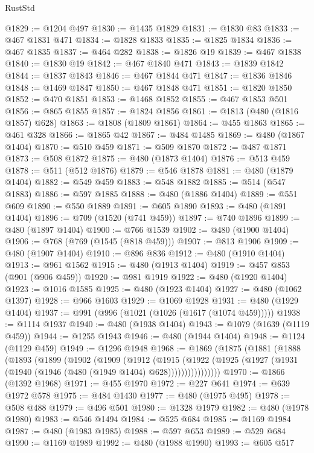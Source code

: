 \begin{lexlean}{RustStd}
\begin{coremodule}
{\begin{coremodule}
{{{{{{{{{{{{{{{{{{{{{{{{{{{{{{{{{@1829 := @1204 @497
@1830 := @1435 @1829
@1831 := @1830 @83
@1833 := @467 @1831 @471
@1834 := @1828 @1833
@1835 := @1825 @1834
@1836 := @467 @1835
@1837 := @464 @282
@1838 := @1826 @19
@1839 := @467 @1838
@1840 := @1830 @19
@1842 := @467 @1840 @471
@1843 := @1839 @1842
@1844 := @1837 @1843
@1846 := @467 @1844 @471
@1847 := @1836 @1846
@1848 := @1469 @1847
@1850 := @467 @1848 @471
@1851 := @1820 @1850
@1852 := @470 @1851
@1853 := @1468 @1852
@1855 := @467 @1853 @501
@1856 := @865 @1855
@1857 := @1824 @1856
@1861 := @1813 (@480 (@1816 @1857) @628)
@1863 := @1808 (@1809 @1861)
@1864 := @455 @1863
@1865 := @461 @328
@1866 := @1865 @42
@1867 := @484 @1485
@1869 := @480 (@1867 @1404)
@1870 := @510 @459
@1871 := @509 @1870
@1872 := @487 @1871
@1873 := @508 @1872
@1875 := @480 (@1873 @1404)
@1876 := @513 @459
@1878 := @511 (@512 @1876)
@1879 := @546 @1878
@1881 := @480 (@1879 @1404)
@1882 := @549 @459
@1883 := @548 @1882
@1885 := @514 (@547 @1883)
@1886 := @597 @1885
@1888 := @480 (@1886 @1404)
@1889 := @551 @609
@1890 := @550 @1889
@1891 := @605 @1890
@1893 := @480 (@1891 @1404)
@1896 := @709 (@1520 (@741 @459))
@1897 := @740 @1896
@1899 := @480 (@1897 @1404)
@1900 := @766 @1539
@1902 := @480 (@1900 @1404)
@1906 := @768 (@769 (@1545 (@818 @459)))
@1907 := @813 @1906
@1909 := @480 (@1907 @1404)
@1910 := @896 @836
@1912 := @480 (@1910 @1404)
@1913 := @961 @1562
@1915 := @480 (@1913 @1404)
@1919 := @457 @853 (@901 (@906 @459))
@1920 := @981 @1919
@1922 := @480 (@1920 @1404)
@1923 := @1016 @1585
@1925 := @480 (@1923 @1404)
@1927 := @480 (@1062 @1397)
@1928 := @966 @1603
@1929 := @1069 @1928
@1931 := @480 (@1929 @1404)
@1937 := @991 (@996 (@1021 (@1026 (@1617 (@1074 @459)))))
@1938 := @1114 @1937
@1940 := @480 (@1938 @1404)
@1943 := @1079 (@1639 (@1119 @459))
@1944 := @1255 @1943
@1946 := @480 (@1944 @1404)
@1948 := @1124 (@1129 @459)
@1949 := @1296 @1948
@1968 := @1869
    (@1875
      (@1881
        (@1888
          (@1893
            (@1899
              (@1902
                (@1909
                  (@1912
                    (@1915
                      (@1922
                        (@1925 (@1927 (@1931 (@1940 (@1946 (@480 (@1949 @1404) @628))))))))))))))))
@1970 := @1866 (@1392 @1968)
@1971 := @455 @1970
@1972 := @227 @641
@1974 := @639 @1972 @578
@1975 := @484 @1430
@1977 := @480 (@1975 @495)
@1978 := @508 @488
@1979 := @496 @501
@1980 := @1328 @1979
@1982 := @480 (@1978 @1980)
@1983 := @546 @1494
@1984 := @525 @684
@1985 := @1169 @1984
@1987 := @480 (@1983 @1985)
@1988 := @597 @653
@1989 := @529 @684
@1990 := @1169 @1989
@1992 := @480 (@1988 @1990)
@1993 := @605 @517
}}}}}}}}}}}}}}}}}}}}}}}}}}}}}}}}}
\end{coremodule}}
\end{coremodule}
\end{lexlean}

